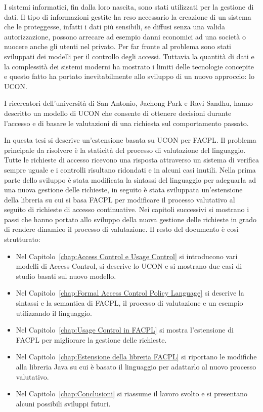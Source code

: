 I sistemi informatici, fin dalla loro nascita, sono stati utilizzati per la gestione di dati.
Il tipo di informazioni gestite ha reso necessario la creazione di un sistema che le proteggesse, infatti i
dati più sensibili, se diffusi senza una valida autorizzazione, possono arrecare ad esempio danni economici
ad una società o nuocere anche gli utenti nel privato.
Per far fronte al problema sono stati sviluppati dei modelli per il controllo degli accessi. Tuttavia la quantità di dati
e la complessità dei sistemi moderni ha mostrato i limiti delle tecnologie concepite e questo fatto ha portato inevitabilmente
allo sviluppo di un nuovo approccio: lo \ac{UCON}.

I ricercatori dell'università di San Antonio, Jaehong Park e Ravi Sandhu, hanno descritto un modello
di \ac{UCON}\cite{ucon} che consente di ottenere decisioni durante l'accesso e di basare le valutazioni di una richiesta
sul comportamento passato.

In questa tesi si descrive un'estensione basata su UCON per \ac{FACPL}.
Il problema principale da risolvere è la staticità del processo di valutazione del linguaggio.
Tutte le richieste di accesso ricevono una risposta attraverso un sistema di verifica sempre uguale e i controlli
risultano ridondati e in alcuni casi inutili.
Nella prima parte dello sviluppo è stata modificata la sintassi del linguaggio per adeguarla ad una nuova
gestione delle richieste, in seguito
è stata sviluppata un'estensione della libreria su cui si basa \ac{FACPL} per modificare
il processo valutativo al seguito di richieste di accesso continuative.
Nei capitoli successivi si mostrano i passi che hanno portato allo sviluppo della nuova gestione delle richieste
in grado di rendere dinamico il processo di valutazione.
\vspace{5mm}
\newline
Il resto del documento è così strutturato:
\begin{itemize}
  \renewcommand\labelitemi{--}
  \item Nel Capitolo~\ref{chap:Access Control e Usage Control}
  si introducono vari modelli di Access Control, si descrive lo \ac{UCON} e si mostrano due casi di studio basati sul nuovo modello.
  \item Nel Capitolo~\ref{chap:Formal Access Control Policy Language}
  si descrive la sintassi e la semantica di \ac{FACPL}, il processo di valutazione e un esempio utilizzando il linguaggio.
  \item Nel Capitolo~\ref{chap:Usage Control in FACPL}
  si mostra l'estensione di \ac{FACPL} per migliorare la gestione delle richieste.
  \item Nel Capitolo~\ref{chap:Estensione della libreria FACPL}
  si riportano le modifiche alla libreria Java su cui è basato il linguaggio per adattarlo al nuovo processo valutativo.
  \item Nel Capitolo~\ref{chap:Conclusioni}
  si riassume il lavoro svolto e si presentano alcuni possibili sviluppi futuri.
\end{itemize}
